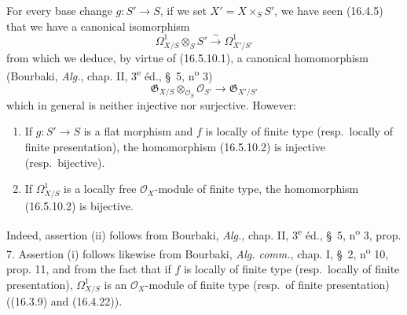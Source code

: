 \begin{env}[16.5.10]
\label{IV.16.5.10}
For every base change $g:S'\to S$, if we set $X'=X\times_S S'$, we
have seen (16.4.5) that we have a canonical isomorphism
\[
  \Omega_{X/S}^1\otimes_S S'\xrightarrow{\sim}\Omega_{X'/S'}^1
  \tag{16.5.10.1}
  \label{IV.16.5.10.1}
\]
from which we deduce, by virtue of (16.5.10.1), a canonical homomorphism
(Bourbaki, \emph{Alg.}, chap. II, 3\textsuperscript{e} éd., \S~5,
n\textsuperscript{o} 3)
\[
  \mathfrak{G}_{X/S}\otimes_{\mathcal{O}_S}\mathcal{O}_{S'}
  \longrightarrow\mathfrak{G}_{X'/S'}
  \tag{16.5.10.2}
  \label{IV.16.5.10.2}
\]
which in general is neither injective nor surjective. However:
\end{env}

\begin{proposition}[16.5.11]
\label{IV.16.5.11}
\begin{enumerate}
\item[(i)] If $g:S'\to S$ is a flat morphism and $f$ is locally of
finite type (resp.\ locally of finite presentation), the homomorphism
(16.5.10.2) is injective (resp.\ bijective).
\item[(ii)] If $\Omega_{X/S}^1$ is a locally free $\mathcal{O}_X$-module
of finite type, the homomorphism (16.5.10.2) is bijective.
\end{enumerate}
\end{proposition}

Indeed, assertion (ii) follows from Bourbaki, \emph{Alg.}, chap. II,
3\textsuperscript{e} éd., \S~5, n\textsuperscript{o} 3, prop. 7. Assertion
(i) follows likewise from Bourbaki, \emph{Alg. comm.}, chap. I, \S~2,
n\textsuperscript{o} 10, prop. 11, and from the fact that if $f$ is locally of
finite type (resp.\ locally of finite presentation), $\Omega_{X/S}^1$ is an
$\mathcal{O}_X$-module of finite type (resp.\ of finite presentation) ((16.3.9)
and (16.4.22)).

